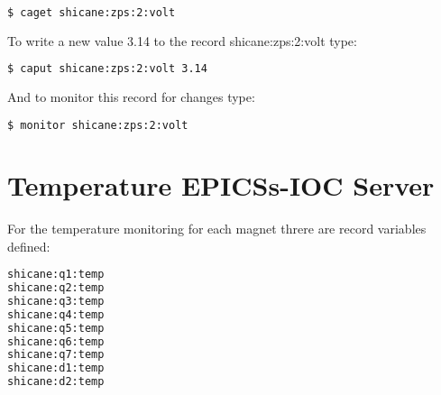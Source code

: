 \begin{lstlisting}[language=bash]
$ caget shicane:zps:2:volt
\end{lstlisting}

To write a new value 3.14 to the record shicane:zps:2:volt type:

\begin{lstlisting}[language=bash]
$ caput shicane:zps:2:volt 3.14
\end{lstlisting}

And to monitor this record for changes type:

\begin{lstlisting}[language=bash]
$ monitor shicane:zps:2:volt
\end{lstlisting}



\section*{Temperature EPICSs-IOC Server}

For the temperature monitoring for each magnet threre are record variables defined:

\begin{lstlisting}[language=bash]
shicane:q1:temp
shicane:q2:temp
shicane:q3:temp
shicane:q4:temp
shicane:q5:temp
shicane:q6:temp
shicane:q7:temp
shicane:d1:temp
shicane:d2:temp
\end{lstlisting}




